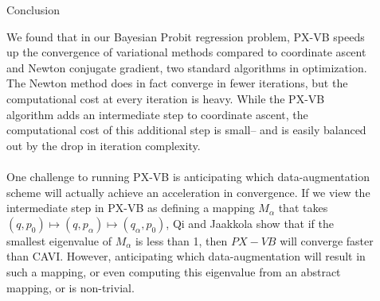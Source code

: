 \documentclass[final]{beamer}
\newlength{\sepwid}
\newlength{\onecolwid}
\newlength{\twocolwid}
\begin{document}
\begin{frame}[t]
\begin{columns}[t]
\begin{column}{\twocolwid}
%
%
%
%

\end{column} %

\begin{column}{\sepwid}\end{column} %

\begin{column}{\onecolwid} %


\begin{block}{Conclusion}

We found that in our Bayesian Probit regression problem, PX-VB speeds up the convergence of variational methods compared to coordinate ascent and Newton conjugate gradient, two standard algorithms in optimization. The Newton method does in fact converge in fewer iterations, but the computational cost at every iteration is heavy. While the PX-VB algorithm adds an intermediate step to coordinate ascent, the computational cost of this additional step is small-- and is easily balanced out by the drop in iteration complexity. \\~\\

One challenge to running PX-VB is anticipating which data-augmentation scheme will actually achieve an acceleration in convergence. If we view the intermediate step in PX-VB as defining a mapping $M_\alpha$ that takes $(q, p_0) \mapsto (q, p_\alpha) \mapsto (q_\alpha, p_0)$, Qi and Jaakkola show that if the smallest eigenvalue of $M_\alpha$ is less than 1, then $PX-VB$ will converge faster than CAVI. However, anticipating which data-augmentation will result in such a mapping, or even computing this eigenvalue from an abstract mapping, or is non-trivial.


\end{block}
\end{column}
\end{columns}
\end{frame}
\end{document}
